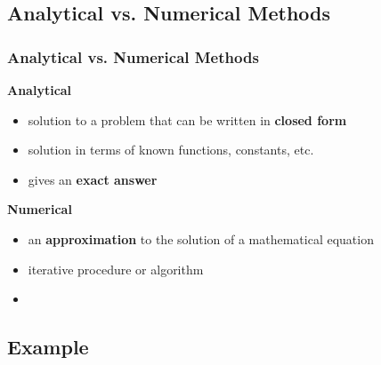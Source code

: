 \documentclass[fleqn]{beamer} %
\newcommand{\sectionIsubsectionIIItitle}{Analytical vs. Numerical Methods}
\newcommand{\sectionIsubsectionIVtitle}{Example}
\begin{document}
		\subsection{\sectionIsubsectionIIItitle}\label{sectionIsubsectionIII}
			\begin{frame} 
				\frametitle{\sectionIsubsectionIIItitle}
				\bigskip

				\textbf{Analytical}
				\begin{itemize}
					\item solution to a problem that can be written in {\bf closed form} 
					\item solution in terms of known functions, constants, etc.  
					\item gives an {\bf exact answer}  \vspcc
				\end{itemize}

				\textbf{Numerical}
				\begin{itemize}
					\item an {\bf approximation} to the solution of a mathematical equation
					\item iterative procedure or algorithm
					\item 
				\end{itemize}

				\btVFill
			\end{frame}	

		\subsection{\sectionIsubsectionIVtitle}\label{sectionIsubsectionIV}	
\end{document}
